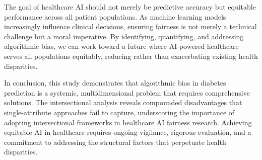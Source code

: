 The goal of healthcare AI should not merely be predictive accuracy but 
equitable performance across all patient populations. As machine learning 
models increasingly influence clinical decisions, ensuring fairness is 
not merely a technical challenge but a moral imperative. By identifying, 
quantifying, and addressing algorithmic bias, we can work toward a future 
where AI-powered healthcare serves all populations equitably, reducing 
rather than exacerbating existing health disparities.

In conclusion, this study demonstrates that algorithmic bias in diabetes 
prediction is a systemic, multidimensional problem that requires comprehensive 
solutions. The intersectional analysis reveals compounded disadvantages that 
single-attribute approaches fail to capture, underscoring the importance of 
adopting intersectional frameworks in healthcare AI fairness research. 
Achieving equitable AI in healthcare requires ongoing vigilance, rigorous 
evaluation, and a commitment to addressing the structural factors that 
perpetuate health disparities.

